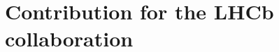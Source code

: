 \chapter{Contribution for the LHCb collaboration} %
\label{cha:contribution_for_the_lhcb_collaboration}

